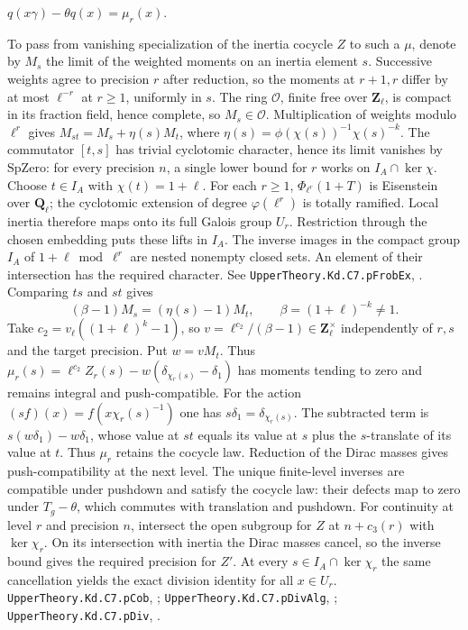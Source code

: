\(q(x\gamma)-\theta q(x)=\mu_r(x)\).
\par To pass from vanishing specialization of the inertia cocycle \(Z\)
to such a \(\mu\), denote by \(M_s\) the limit of the weighted moments
on an inertia element \(s\). Successive weights agree to precision \(r\)
after reduction, so the moments at \(r+1,r\) differ by at most
\(\ell^{-r}\) at \(r\ge1\), uniformly in \(s\). The ring \(\mathcal O\), finite free over \(\mathbf Z_\ell\), is compact in its fraction field, hence complete, so \(M_s\in\mathcal O\).
Multiplication of weights modulo \(\ell^r\) gives
\(M_{st}=M_s+\eta(s)M_t\), where
\(\eta(s)=\phi(\chi(s))^{-1}\chi(s)^{-k}\).
The commutator \([t,s]\) has trivial cyclotomic character, hence its
limit vanishes by \(\mathrm{SpZero}\): for every precision \(n\), a single lower bound for \(r\) works on \(I_A\cap\ker\chi\). Choose
\(t\in I_A\) with \(\chi(t)=1+\ell\). For each \(r\ge1\), \(\Phi_{\ell^r}(1+T)\) is Eisenstein over \(\mathbf Q_\ell\); the cyclotomic extension of degree \(\varphi(\ell^r)\) is totally ramified. Local inertia therefore maps onto its full Galois group \(U_r\). Restriction through the chosen embedding puts these lifts in \(I_A\).
The inverse images in the compact group \(I_A\) of \(1+\ell\bmod\ell^r\) are nested nonempty closed sets. An element of their intersection has the required character. See \nolinkurl{UpperTheory.Kd.C7.pFrobEx}, .
Comparing \(ts\) and \(st\) gives
\[
 (\beta-1)M_s=(\eta(s)-1)M_t,\qquad\beta=(1+\ell)^{-k}\ne1 .
\]
Take \(c_2=v_\ell((1+\ell)^k-1)\), so \(v=\ell^{c_2}/(\beta-1)\in\mathbf Z_\ell^\times\) independently of \(r,s\) and the target precision. Put
\(w=vM_t\). Thus
\(\mu_r(s)=\ell^{c_2}Z_r(s)-w(\delta_{\chi_r(s)}-\delta_1)\)
has moments tending to zero and remains integral and push-compatible. For the action \((s f)(x)=f(x\chi_r(s)^{-1})\) one has \(s\delta_1=\delta_{\chi_r(s)}\). The subtracted term is \(s(w\delta_1)-w\delta_1\), whose value at \(st\) equals its value at \(s\) plus the \(s\)-translate of its value at \(t\). Thus \(\mu_r\) retains the cocycle law. Reduction of the Dirac masses gives push-compatibility at the next level.
The unique finite-level inverses are compatible under pushdown and
satisfy the cocycle law: their defects map to zero under
\(T_g-\theta\), which commutes with translation and pushdown.
For continuity at level \(r\) and precision \(n\), intersect the open subgroup for \(Z\) at \(n+c_3(r)\) with \(\ker\chi_r\).
On its intersection with inertia the Dirac masses cancel, so the inverse bound gives the required precision for \(Z'\).
At every \(s\in I_A\cap\ker\chi_r\) the same cancellation yields the exact division identity for all \(x\in U_r\).
\nolinkurl{UpperTheory.Kd.C7.pCob}, ;
\nolinkurl{UpperTheory.Kd.C7.pDivAlg}, ;
\nolinkurl{UpperTheory.Kd.C7.pDiv}, .

